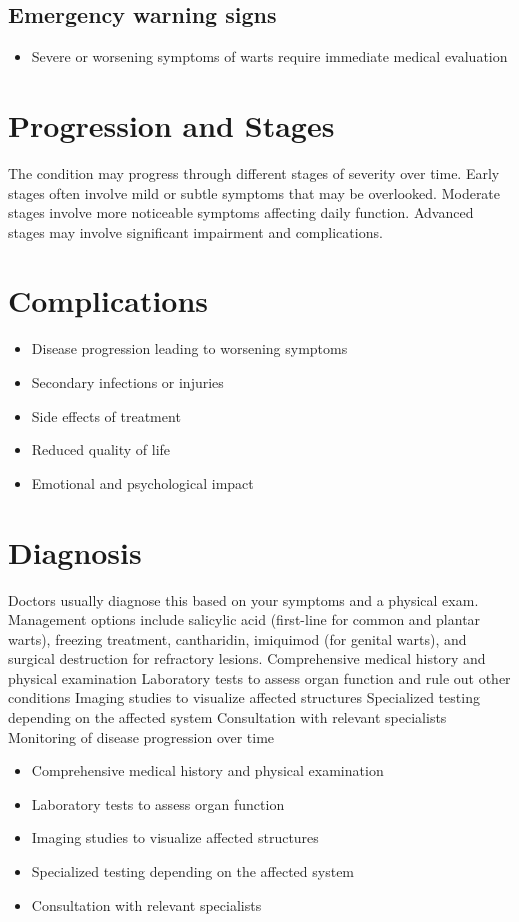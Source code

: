 \subsection{Emergency warning signs}
\begin{itemize}[noitemsep]
  \item Severe or worsening symptoms of warts require immediate medical evaluation
\end{itemize}
\section{Progression and Stages}
The condition may progress through different stages of severity over time. Early stages often involve mild or subtle symptoms that may be overlooked. Moderate stages involve more noticeable symptoms affecting daily function. Advanced stages may involve significant impairment and complications.
\section{Complications}
\begin{itemize}[noitemsep]
  \item Disease progression leading to worsening symptoms
  \item Secondary infections or injuries
  \item Side effects of treatment
  \item Reduced quality of life
  \item Emotional and psychological impact
\end{itemize}
\section{Diagnosis}
Doctors usually diagnose this based on your symptoms and a physical exam. Management options include salicylic acid (first-line for common and plantar warts), freezing treatment, cantharidin, imiquimod (for genital warts), and surgical destruction for refractory lesions. Comprehensive medical history and physical examination Laboratory tests to assess organ function and rule out other conditions Imaging studies to visualize affected structures Specialized testing depending on the affected system Consultation with relevant specialists Monitoring of disease progression over time

\begin{itemize}[noitemsep]
  \item Comprehensive medical history and physical examination
  \item Laboratory tests to assess organ function
  \item Imaging studies to visualize affected structures
  \item Specialized testing depending on the affected system
  \item Consultation with relevant specialists
\end{itemize}
